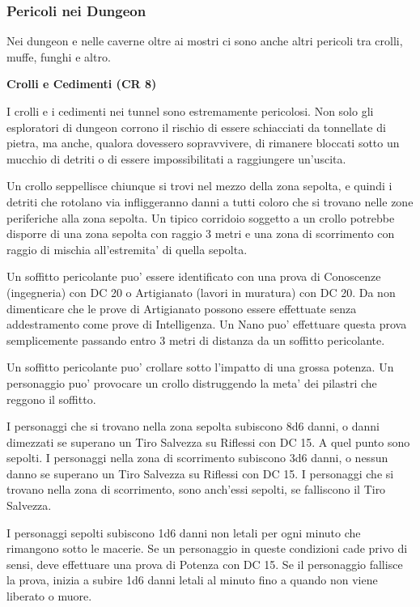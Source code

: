 \documentclass[a4paper,11pt,twoside,openany]{book}
\begin{document}
{		\subsubsection{Pericoli nei Dungeon}
		
		Nei dungeon e nelle caverne oltre ai mostri ci sono anche altri pericoli tra crolli, muffe, funghi e altro.
		
		\textbf{Crolli e Cedimenti (CR 8)}
		
		I crolli e i cedimenti nei tunnel sono estremamente pericolosi. Non solo gli esploratori di dungeon corrono il rischio di essere schiacciati da tonnellate di pietra, ma anche, qualora dovessero sopravvivere, di rimanere bloccati sotto un mucchio di detriti o di essere impossibilitati a raggiungere un'uscita.
		
		Un crollo seppellisce chiunque si trovi nel mezzo della zona sepolta, e quindi i detriti che rotolano via infliggeranno danni a tutti coloro che si trovano nelle zone periferiche alla zona sepolta. Un tipico corridoio soggetto a un crollo potrebbe disporre di una zona sepolta con raggio 3 metri e una zona di scorrimento con raggio di mischia all'estremita' di quella sepolta.
		
		Un soffitto pericolante puo' essere identificato con una prova di Conoscenze (ingegneria) con DC 20 o Artigianato (lavori in muratura) con DC 20. Da non dimenticare che le prove di Artigianato possono essere effettuate senza addestramento come prove di Intelligenza. Un Nano puo' effettuare questa prova semplicemente passando entro 3 metri di distanza da un soffitto pericolante. 
		
		Un soffitto pericolante puo' crollare sotto l'impatto di una grossa potenza. Un personaggio puo' provocare un crollo distruggendo la meta' dei pilastri che reggono il soffitto.
		
		I personaggi che si trovano nella zona sepolta subiscono 8d6 danni, o danni dimezzati se superano un Tiro Salvezza su Riflessi con DC 15. A quel punto sono sepolti. I personaggi nella zona di scorrimento subiscono 3d6 danni, o nessun danno se superano un Tiro Salvezza su Riflessi con DC 15. I personaggi che si trovano nella zona di scorrimento, sono anch'essi sepolti, se falliscono il Tiro Salvezza.
		
		I personaggi sepolti subiscono 1d6 danni non letali per ogni minuto che rimangono sotto le macerie. Se un personaggio in queste condizioni cade privo di sensi, deve effettuare una prova di Potenza con DC 15. Se il personaggio fallisce la prova, inizia a subire 1d6 danni letali al minuto fino a quando non viene liberato o muore.
		
}
\end{document}

